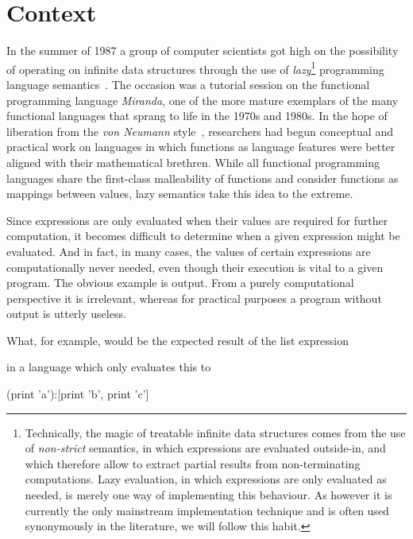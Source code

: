 \chapter{Context}

In the summer of 1987 a group of computer scientists got high on the
possibility of operating on infinite data structures through the use of
\emph{lazy}\footnote{Technically, the magic of treatable infinite data
structures comes from the use of \emph{non-strict} semantics, in which
expressions are evaluated outside-in, and which therefore allow to extract
partial results from non-terminating computations. Lazy evaluation, in which
expressions are only evaluated as needed, is merely one way of implementing
this behaviour. As however it is currently the only mainstream implementation
technique and is often used synonymously in the literature, we will follow this
habit.} programming language semantics~\cite[p. 12-3]{hask-history}. The
occasion was a tutorial session on the functional programming language
\emph{Miranda}, one of the more mature exemplars of the many functional
languages that sprang to life in the 1970s and 1980s. In the hope of liberation
from the \emph{von Neumann} style~\cite{backus}, researchers had begun
conceptual and practical work on languages in which functions as language
features were better aligned with their mathematical brethren. While all
functional programming languages share the first-class malleability of
functions and consider functions as mappings between values, lazy semantics
take this idea to the extreme.

Since expressions are only evaluated when their values are required for
further computation, it becomes difficult to determine when a given
expression might be evaluated. And in fact, in many cases, the values of
certain expressions are computationally never needed, even though their
execution is vital to a given program. The obvious example is output.
From a purely computational perspective it is irrelevant, whereas for
practical purposes a program without output is utterly useless.

What, for example, would be the expected result of the list expression

\begin{code}
\end{code}

in a language which only evaluates this to

\begin{code}
  (print 'a'):[print 'b', print 'c']
\end{code}

